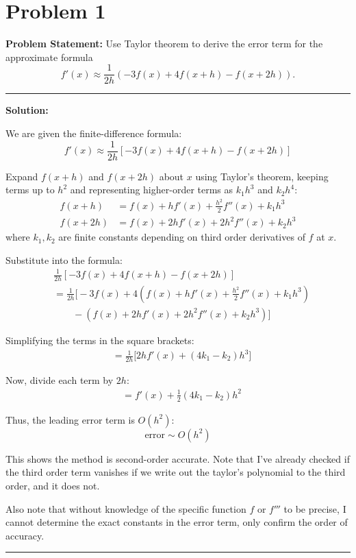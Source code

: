 \clearpage
\section*{Problem 1}

\textbf{Problem Statement:} Use Taylor theorem to derive the error term for the approximate formula
$$f'(x) \approx \frac{1}{2h} (-3f(x) + 4f(x+h) - f(x+2h)).$$

\noindent\rule{\textwidth}{0.4pt}

\vspace{1em}

\textbf{Solution:}

We are given the finite-difference formula:
\begin{equation*}
    f'(x) \approx \frac{1}{2h}\left[-3f(x) + 4f(x+h) - f(x+2h)\right]
\end{equation*}

Expand $f(x+h)$ and $f(x+2h)$ about $x$ using Taylor's theorem, keeping terms up to $h^2$ and representing higher-order terms as $k_1 h^3$ and $k_2 h^4$:
\begin{align*}
    f(x+h) &= f(x) + h f'(x) + \frac{h^2}{2} f''(x) + k_1 h^3 \\
    f(x+2h) &= f(x) + 2h f'(x) + 2h^2 f''(x) + k_2 h^3
\end{align*}
where $k_1, k_2$ are finite constants depending on third order derivatives of $f$ at $x$.

Substitute into the formula:
\begin{align*}
    &\frac{1}{2h}\left[-3f(x) + 4f(x+h) - f(x+2h)\right] \\
    &= \frac{1}{2h}\Big[-3f(x) + 4\left(f(x) + h f'(x) + \frac{h^2}{2} f''(x) + k_1 h^3\right) \\
    &\qquad - \left(f(x) + 2h f'(x) + 2h^2 f''(x) + k_2 h^3\right)\Big]
\end{align*}

Simplifying the terms in the square brackets:
\begin{align*}
    &= \frac{1}{2h}\Big[2h f'(x) + (4k_1 - k_2) h^3\Big]
\end{align*}

Now, divide each term by $2h$:
\begin{align*}
    &= f'(x) + \frac{1}{2} (4k_1 - k_2) h^2
\end{align*}

Thus, the leading error term is $O(h^2)$:
\begin{equation*}
    \text{error} \sim O(h^2)
\end{equation*}

This shows the method is second-order accurate. Note that I've already checked if the third order term vanishes if we write out the taylor's polynomial to the third order, and it does not.

Also note that without knowledge of the specific function $f$ or $f'''$ to be precise, I cannot determine the exact constants in the error term, only confirm the order of accuracy.

\vspace{2em}
\noindent\rule{\textwidth}{0.4pt}
